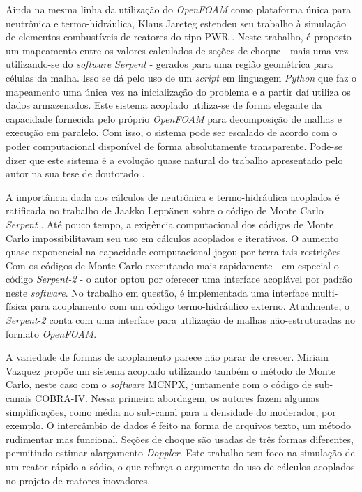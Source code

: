 Ainda na mesma linha da utilização do \textit{OpenFOAM} como plataforma única para neutrônica e
termo-hidráulica, Klaus Jareteg estendeu seu trabalho à simulação de elementos combustíveis de
reatores do tipo PWR \cite{Jareteg2015}. Neste trabalho, é proposto um mapeamento entre os valores
calculados de seções de choque - mais uma vez utilizando-se do \textit{software Serpent} - gerados
para uma região geométrica para células da malha. Isso se dá pelo uso de um \textit{script} em
linguagem \textit{Python} que faz o mapeamento uma única vez na inicialização do problema e
a partir daí utiliza os dados armazenados. Este sistema acoplado utiliza-se de forma elegante da
capacidade fornecida pelo próprio \textit{OpenFOAM} para decomposição de malhas e execução em paralelo.
Com isso, o sistema pode ser escalado de acordo com o poder computacional disponível de forma
absolutamente transparente. Pode-se dizer que este sistema é a evolução quase natural do trabalho
apresentado pelo autor na sua tese de doutorado \cite{Jareteg2012}.



A importância dada aos cálculos de neutrônica e termo-hidráulica acoplados
é ratificada no trabalho de Jaakko Leppänen sobre o código de Monte Carlo
\textit{Serpent} \cite{Leppanen2012}. Até pouco tempo, a exigência computacional dos códigos
de Monte Carlo impossibilitavam seu uso em cálculos acoplados e iterativos. O aumento
quase exponencial na capacidade computacional jogou por terra tais restrições.
Com os códigos de Monte Carlo executando mais rapidamente - em especial o código \textit{Serpent-2} -
o autor optou por oferecer uma interface acoplável por padrão neste \textit{software}.
No trabalho em questão, é implementada uma interface multi-física para acoplamento com um
código termo-hidráulico externo. Atualmente, o \textit{Serpent-2} conta com uma interface para utilização
de malhas não-estruturadas no formato \textit{OpenFOAM}.

A variedade de formas de acoplamento parece não parar de crescer. Miriam Vazquez
\cite{Vazquez2012} propõe
um sistema acoplado utilizando também o método de Monte Carlo, neste caso com o
\textit{software} MCNPX, juntamente com o código de sub-canais COBRA-IV. Nessa primeira
abordagem, os autores fazem algumas simplificações, como média no sub-canal para a
densidade do moderador, por exemplo. O intercâmbio de dados é feito na forma de arquivos
texto, um método rudimentar mas funcional. Seções de choque são usadas de três formas
diferentes, permitindo estimar alargamento \textit{Doppler}. Este trabalho tem foco na simulação
de um reator rápido a sódio, o que reforça o argumento do uso de cálculos acoplados no projeto
de reatores inovadores.

